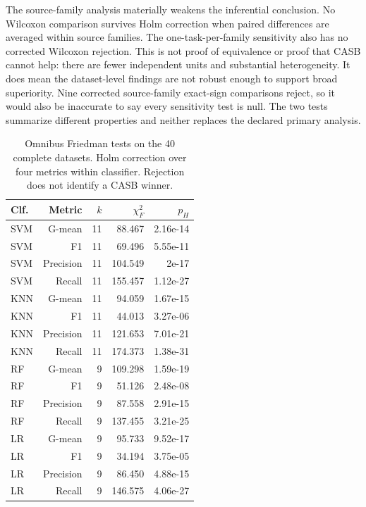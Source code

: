 \documentclass[conference]{IEEEtran}
\begin{document}
The source-family analysis materially weakens the inferential conclusion. No Wilcoxon comparison survives Holm correction when paired differences are averaged within source families. The one-task-per-family sensitivity also has no corrected Wilcoxon rejection. This is not proof of equivalence or proof that CASB cannot help: there are fewer independent units and substantial heterogeneity. It does mean the dataset-level findings are not robust enough to support broad superiority. Nine corrected source-family exact-sign comparisons reject, so it would also be inaccurate to say every sensitivity test is null. The two tests summarize different properties and neither replaces the declared primary analysis.
\begin{table}[!t]
\centering\small
\caption{Omnibus Friedman tests on the 40 complete datasets. Holm correction over four metrics within classifier. Rejection does not identify a CASB winner.}\label{tab:friedman}
\begin{tabular}{lrrrr}\toprule
Clf. & Metric & $k$ & $\chi_F^2$ & $p_H$ \\
\midrule
SVM & G-mean & 11 & 88.467 & 2.16e-14 \\
SVM & F1 & 11 & 69.496 & 5.55e-11 \\
SVM & Precision & 11 & 104.549 & 2e-17 \\
SVM & Recall & 11 & 155.457 & 1.12e-27 \\
KNN & G-mean & 11 & 94.059 & 1.67e-15 \\
KNN & F1 & 11 & 44.013 & 3.27e-06 \\
KNN & Precision & 11 & 121.653 & 7.01e-21 \\
KNN & Recall & 11 & 174.373 & 1.38e-31 \\
RF & G-mean & 9 & 109.298 & 1.59e-19 \\
RF & F1 & 9 & 51.126 & 2.48e-08 \\
RF & Precision & 9 & 87.558 & 2.91e-15 \\
RF & Recall & 9 & 137.455 & 3.21e-25 \\
LR & G-mean & 9 & 95.733 & 9.52e-17 \\
LR & F1 & 9 & 34.194 & 3.75e-05 \\
LR & Precision & 9 & 86.450 & 4.88e-15 \\
LR & Recall & 9 & 146.575 & 4.06e-27 \\
\bottomrule\end{tabular}
\end{table}
\end{document}
